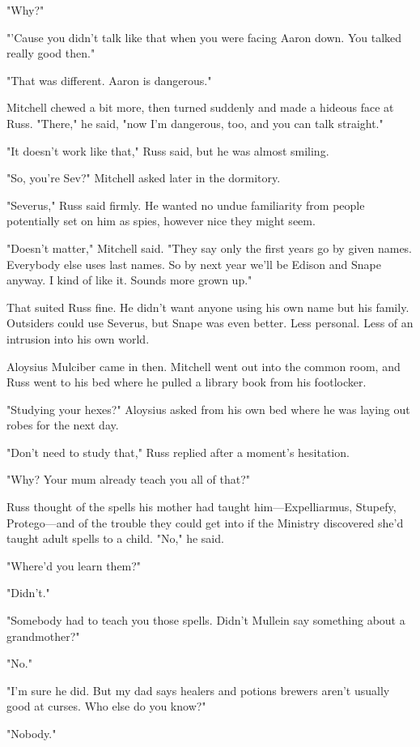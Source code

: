 "Why?"

"'Cause you didn't talk like that when you were facing Aaron down. You talked really good then."

"That was{\el} different. Aaron is{\el} dangerous."

Mitchell chewed a bit more, then turned suddenly and made a hideous face at Russ. "There," he said, "now I'm dangerous, too, and you can talk straight."

"It doesn't{\el} work like that," Russ said, but he was almost smiling.

"So, you're Sev?" Mitchell asked later in the dormitory.

"Severus," Russ said firmly. He wanted no undue familiarity from people potentially set on him as spies, however nice they might seem.

"Doesn't matter," Mitchell said. "They say only the first years go by given names. Everybody else uses last names. So by next year we'll be Edison and Snape anyway. I kind of like it. Sounds more grown up."

That suited Russ fine. He didn't want anyone using his own name but his family. Outsiders could use Severus, but Snape was even better. Less personal. Less of an intrusion into his own world.

Aloysius Mulciber came in then. Mitchell went out into the common room, and Russ went to his bed where he pulled a library book from his footlocker.

"Studying your hexes?" Aloysius asked from his own bed where he was laying out robes for the next day.

"Don't need to{\el} study that," Russ replied after a moment's hesitation.

"Why? Your mum already teach you all of that?"

Russ thought of the spells his mother had taught him—Expelliarmus, Stupefy, Protego{\el}—and of the trouble they could get into if the Ministry discovered she'd taught adult spells to a child. "No," he said.

"Where'd you learn them?"

"Didn't."

"Somebody had to teach you those spells. Didn't Mullein say something about a grandmother?"

"No."

"I'm sure he did. But my dad says healers and potions brewers aren't usually good at curses. Who else do you know?"

"Nobody."

